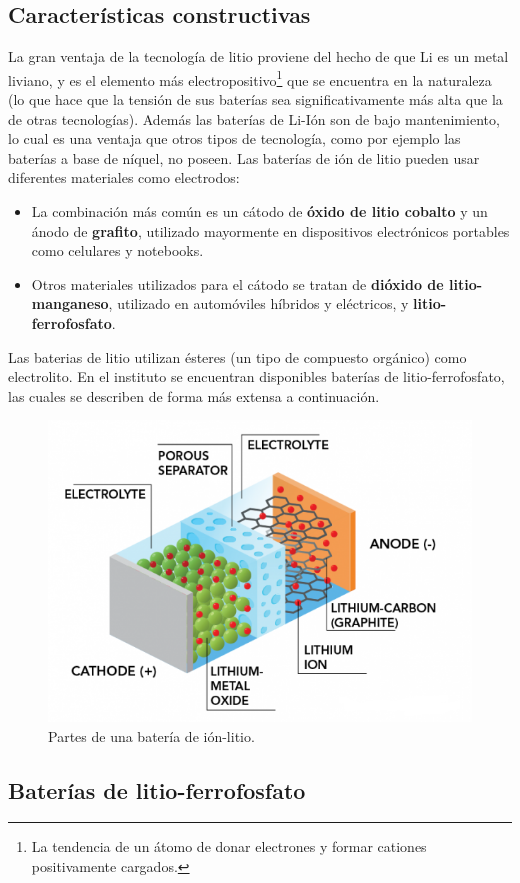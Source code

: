 \subsection{Características constructivas}

La gran ventaja de la tecnología de litio proviene del hecho de que Li es un metal liviano, y es el elemento más electropositivo\footnote{La tendencia de un átomo de donar electrones y formar cationes positivamente cargados.} que se encuentra en la naturaleza (lo que hace que la tensión de sus baterías sea significativamente más alta que la de otras tecnologías). Además las baterías de Li-Ión son de bajo mantenimiento, lo cual es una ventaja que otros tipos de tecnología, como por ejemplo las baterías a base de níquel, no poseen. Las baterías de ión de litio pueden usar diferentes materiales como electrodos:

\begin{itemize}
  \item La combinación más común es un cátodo de \textbf{óxido de litio cobalto} y un ánodo de \textbf{grafito}, utilizado mayormente en dispositivos electrónicos portables como celulares y notebooks.
  \item Otros materiales utilizados para el cátodo se tratan de \textbf{dióxido de litio-manganeso}, utilizado en automóviles híbridos y eléctricos, y \textbf{litio-ferrofosfato}.
\end{itemize}

Las baterias de litio utilizan ésteres (un tipo de compuesto orgánico) como electrolito. En el instituto se encuentran disponibles baterías de litio-ferrofosfato, las cuales se describen de forma más extensa a continuación.

\begin{figure}[hbt!]
  \centering
  \includegraphics[width=0.47\columnwidth]{Imágenes/Partes de una batería.png}
  \caption{Partes de una batería de ión-litio.}
  \label{bateria}
\end{figure} 

\subsection{Baterías de litio-ferrofosfato}


